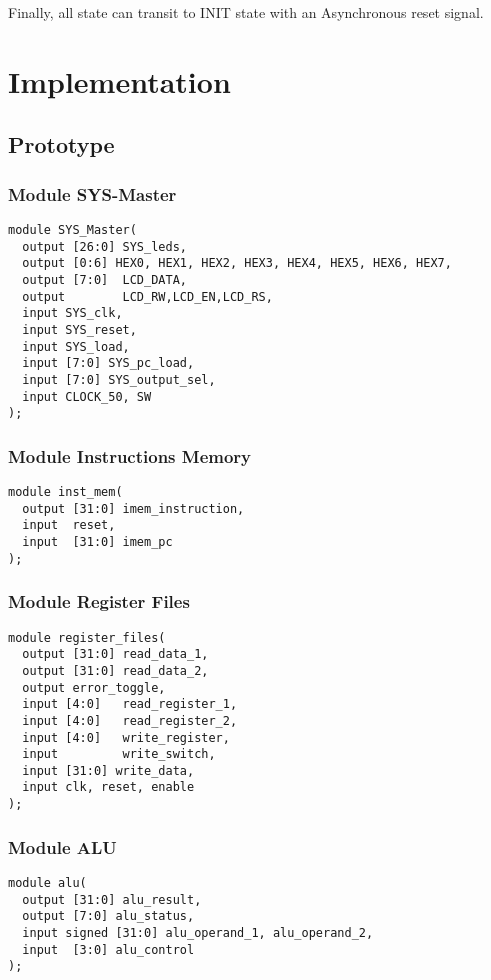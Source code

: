 \documentclass[12pt, a4paper, oneside]{article}
\begin{document}
	Finally, all state can transit to INIT state with an Asynchronous reset signal.
	
	
\section{Implementation}
     \subsection{Prototype}
   \subsubsection{Module SYS-Master}
     \begin{lstlisting}
module SYS_Master(
  output [26:0] SYS_leds,
  output [0:6] HEX0, HEX1, HEX2, HEX3, HEX4, HEX5, HEX6, HEX7,
  output [7:0]	LCD_DATA,
  output		LCD_RW,LCD_EN,LCD_RS,
  input SYS_clk,
  input SYS_reset,
  input SYS_load,
  input [7:0] SYS_pc_load,
  input [7:0] SYS_output_sel,
  input CLOCK_50, SW
);
     \end{lstlisting}
     
     \subsubsection{Module Instructions Memory}
     \begin{lstlisting}
module inst_mem(
  output [31:0] imem_instruction,
  input  reset,
  input  [31:0] imem_pc
);
     \end{lstlisting}
     
      \subsubsection{Module Register Files}
     \begin{lstlisting}
module register_files(
  output [31:0] read_data_1,
  output [31:0] read_data_2,
  output error_toggle,
  input [4:0]   read_register_1, 
  input [4:0]   read_register_2, 
  input [4:0]   write_register, 
  input         write_switch,
  input [31:0] write_data,
  input clk, reset, enable
);
     \end{lstlisting}
     
      \subsubsection{Module ALU}
     \begin{lstlisting}
module alu(
  output [31:0] alu_result,
  output [7:0] alu_status,
  input signed [31:0] alu_operand_1, alu_operand_2,
  input  [3:0] alu_control
);
     \end{lstlisting}
     
\end{document}

